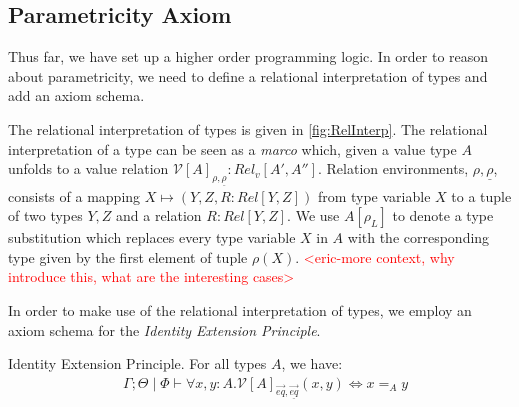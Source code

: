 \documentclass[acmsmall]{acmart}
\newcommand{\eric}[1]{\textcolor{red}{ <eric-#1> }}
\begin{document}




\subsection{Parametricity Axiom}
Thus far, we have set up a higher order programming logic. In order to reason about parametricity, we need to define a relational interpretation of types and add an axiom schema.

The relational interpretation of types is given in \cref{fig:RelInterp}. The relational interpretation of a type can be seen as a \textit{marco} which, given a value type $A$ unfolds to a value relation $\mathcal{V}[A]_{\rho,\underline{\rho}} : Rel_v[A',A'']$. Relation environments, $\rho,\underline{\rho}$, consists of a mapping $X\mapsto (Y,Z,R : Rel[Y,Z])$ from type variable $X$ to a tuple of two types $Y,Z$ and a relation $R : Rel[Y,Z]$. We use $A[\rho_L]$ to denote a type substitution which replaces every type variable $X$ in $A$ with the corresponding type given by the first element of tuple $\rho(X)$. \eric{more context, why introduce this, what are the interesting cases}

In order to make use of the relational interpretation of types, we employ an axiom schema for the \textit{Identity Extension Principle}.

\begin{definition}
  Identity Extension Principle. For all types $A$, we have:
  \begin{align*}
    &  \Gamma ; \Theta \;|\; \Phi \vdash \forall x,y : A. \mathcal{V}[A]_{\overrightarrow{eq},\underline{\overrightarrow{eq}}}(x,y) \iff x =_A y  \\ 
  \end{align*}
\end{definition}
\end{document}

